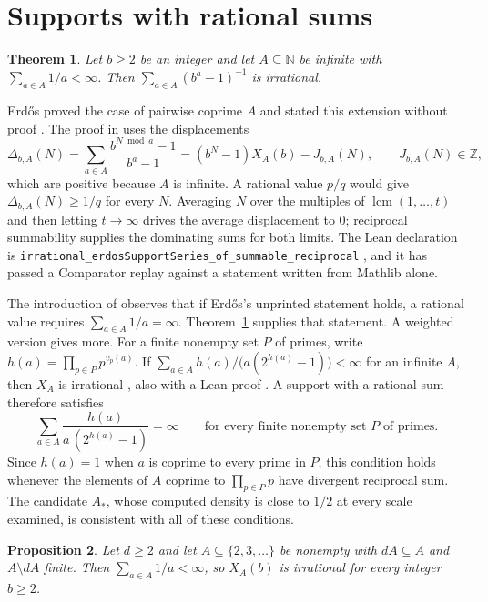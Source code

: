 \documentclass[11pt]{amsart}
\newtheorem{theorem}{Theorem}
\newtheorem{proposition}[theorem]{Proposition}
\newcommand{\N}{\mathbb N}
\newcommand{\Z}{\mathbb Z}
\begin{document}
\section{Supports with rational sums}

\begin{theorem}\label{thm:recip}
Let $b\ge2$ be an integer and let $A\subseteq\N$ be infinite with
$\sum_{a\in A}1/a<\infty$. Then $\sum_{a\in A}(b^a-1)^{-1}$ is irrational.
\end{theorem}

Erd\H{o}s proved the case of pairwise coprime $A$ and stated this extension
without proof \cite[p.~222]{erdos1968}. The proof in
\cite[Theorem~A.1]{cooknote} uses the displacements
\[
 \Delta_{b,A}(N)=\sum_{a\in A}\frac{b^{N\bmod a}-1}{b^a-1}
 =(b^N-1)X_A(b)-J_{b,A}(N),\qquad J_{b,A}(N)\in\Z,
\]
which are positive because $A$ is infinite. A rational value $p/q$ would give
$\Delta_{b,A}(N)\ge1/q$ for every $N$. Averaging $N$ over the multiples of
$\operatorname{lcm}(1,\dots,t)$ and then letting $t\to\infty$ drives the
average displacement to $0$; reciprocal summability supplies the dominating
sums for both limits. The Lean declaration is
\texttt{irrational\_erdosSupportSeries\_of\_summable\_reciprocal}
\cite{leanrecip}, and it has passed a Comparator replay against a statement
written from Mathlib alone.

The introduction of \cite{hong} observes that if Erd\H{o}s's unprinted
statement holds, a rational value requires $\sum_{a\in A}1/a=\infty$.
Theorem~\ref{thm:recip} supplies that statement. A weighted version gives
more. For a finite nonempty set $P$ of primes, write
$h(a)=\prod_{p\in P}p^{v_p(a)}$. If
$\sum_{a\in A}h(a)/\bigl(a(2^{h(a)}-1)\bigr)<\infty$ for an infinite $A$, then
$X_A$ is irrational \cite[Theorem~1.2]{cooknote}, also with a Lean proof
\cite{leanweighted}. A support with a rational sum therefore satisfies
\[
 \sum_{a\in A}\frac{h(a)}{a\,(2^{h(a)}-1)}=\infty
 \qquad\text{for every finite nonempty set $P$ of primes.}
\]
Since $h(a)=1$ when $a$ is coprime to every prime in $P$, this condition holds
whenever the elements of $A$ coprime to $\prod_{p\in P}p$ have divergent
reciprocal sum. The candidate $A_*$, whose computed density is close to $1/2$
at every scale examined, is consistent with all of these conditions.

\begin{proposition}\label{prop:dilation}
Let $d\ge2$ and let $A\subseteq\{2,3,\dots\}$ be nonempty with $dA\subseteq A$
and $A\setminus dA$ finite. Then $\sum_{a\in A}1/a<\infty$, so $X_A(b)$ is
irrational for every integer $b\ge2$.
\end{proposition}
\end{document}
